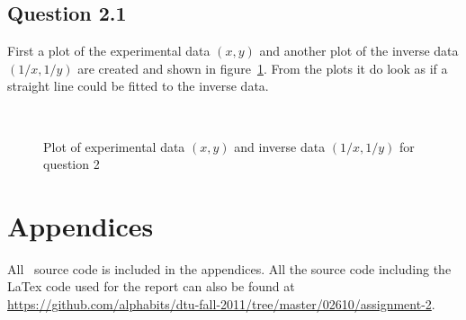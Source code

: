 \subsection*{Question 2.1}


First a plot of the experimental data $(x,y)$ and another plot of the inverse data $(1/x, 1/y)$ are created and shown in figure~\ref{fig:ex2-plot-data}. From the plots it do look as if a straight line could be fitted to the inverse data.

\begin{figure}
    \centering
    \mbox{ \quad 
          }
    \caption{Plot of experimental data $(x,y)$ and inverse data $(1/x, 1/y)$ for question 2}
    \label{fig:ex2-plot-data}
\end{figure}


\pagebreak
\renewcommand\thesection{\Alph{section}}


\section{Appendices}

All \matlab\ source code is included in the appendices. All the source code
including the LaTex code used for the report can also be found at
\url{https://github.com/alphabits/dtu-fall-2011/tree/master/02610/assignment-2}.

